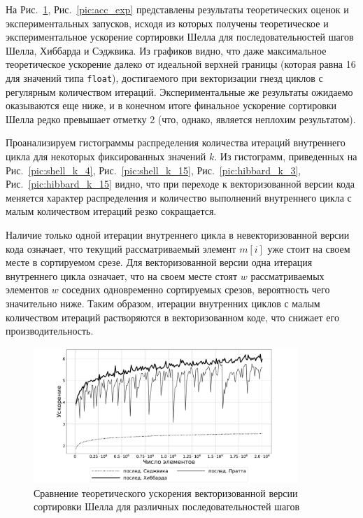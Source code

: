 \documentclass[utf8]{psta}
\begin{document}
На Рис.~\ref{pic:acc_theor}, Рис.~\ref{pic:acc_exp} представлены результаты теоретических оценок и экспериментальных запусков, исходя из которых получены теоретическое и экспериментальное ускорение сортировки Шелла для последовательностей шагов Шелла, Хиббарда и Сэджвика. 
Из графиков видно, что даже максимальное теоретическое ускорение далеко от идеальной верхней границы (которая равна 16 для значений типа \texttt{float}), достигаемого при векторизации гнезд циклов с регулярным количеством итераций. 
Экспериментальные же результаты ожидаемо оказываются еще ниже, и в конечном итоге финальное ускорение сортировки Шелла редко превышает отметку 2 (что, однако, является неплохим результатом).

Проанализируем гистограммы распределения количества итераций внутреннего цикла для некоторых фиксированных значений $k$. 
Из гистограмм, приведенных на Рис.~\ref{pic:shell_k_4}, Рис.~\ref{pic:shell_k_15}, Рис.~\ref{pic:hibbard_k_3}, Рис.~\ref{pic:hibbard_k_15} видно, что при переходе к векторизованной версии кода меняется характер распределения и количество выполнений внутреннего цикла с малым количеством итераций резко сокращается.

Наличие только одной итерации внутреннего цикла в невекторизованной версии кода означает, что текущий рассматриваемый элемент $m[i]$ уже стоит на своем месте в сортируемом срезе.
Для векторизованной версии одна итерация внутреннего цикла означает, что на своем месте стоят $w$ рассматриваемых элементов $w$ соседних одновременно сортируемых срезов, вероятность чего значительно ниже. 
Таким образом, итерации внутренних циклов с малым количеством итераций растворяются в векторизованном коде, что снижает его производительность.

\begin{figure}
\includegraphics[width=10cm]{pics/theoretical_eff}
\caption{Сравнение теоретического ускорения векторизованной версии сортировки Шелла для различных последовательностей шагов}
\label{pic:acc_theor}
\end{figure}
\end{document}
